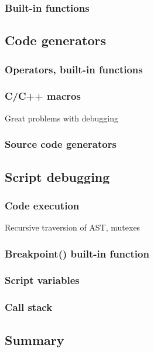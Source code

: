 \documentclass[11pt,twoside,a4paper]{book}
\begin{document}
\subsubsection{Built-in functions}


\subsection{Code generators}

\subsubsection{Operators, built-in functions}

\subsubsection{C/C++ macros}
Great problems with debugging

\subsubsection{Source code generators}


\subsection{Script debugging}

\subsubsection{Code execution}

Recursive traversion of AST, mutexes


\subsubsection{Breakpoint() built-in function}

\subsubsection{Script variables}

\subsubsection{Call stack}


\subsection{Summary}
\end{document}
